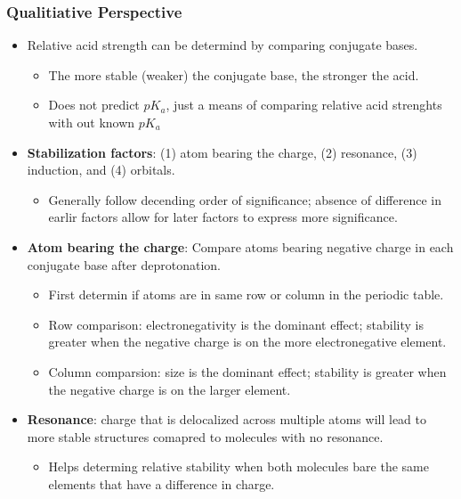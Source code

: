 \documentclass[12pt,a4paper]{article}
\begin{document}
\begin{itemize}
    \subsubsection{Qualitiative Perspective}
    \begin{itemize}
        \item Relative acid strength can be determind by comparing conjugate bases. 
            \begin{itemize}
                \item The {\color{o-Sun}more stable} (weaker) the conjugate base, the {\color{o-Sun}stronger} the acid.
                \item Does not predict \(pK_a\), just a means of comparing relative acid strenghts with out known \(pK_a\)
            \end{itemize}
        \item \textbf{Stabilization factors}: (1) {\color{o-Sun}atom bearing the charge}, (2) {\color{o-Sun}resonance}, (3) {\color{o-Sun}induction}, and (4) {\color{o-Sun}orbitals}.
            \begin{itemize}
                \item Generally follow decending order of significance; absence of difference in earlir factors allow for later factors to express more significance.
            \end{itemize}
        \item \textbf{Atom bearing the charge}: Compare atoms bearing negative charge in each conjugate base after deprotonation.
            \begin{itemize}
                \item First determin if atoms are in same row or column in the periodic table.
                \item {\color{o-Sun}Row} comparison: {\color{o-Sun}electronegativity} is the dominant effect; stability is greater when the negative charge is on the {\color{o-Sun}more electronegative} element.
                \item {\color{o-Sun}Column} comparsion: {\color{o-Sun}size} is the dominant effect; stability is greater when the negative charge is on the {\color{o-Sun}larger} element. 
            \end{itemize}
        \item \textbf{Resonance}: charge that is delocalized across multiple atoms will lead to more stable structures comapred to molecules with no resonance.
            \begin{itemize}
                \item Helps determing relative stability when both molecules bare the same elements that have a difference in charge.

\end{itemize}
\end{itemize}
\end{itemize}
\end{document}
